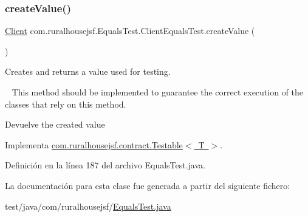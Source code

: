 \mbox{\label{classcom_1_1ruralhousejsf_1_1_equals_test_1_1_client_equals_test_aa74f54ea042862db1a5499d31ec75539}} 
\subsubsection{\texorpdfstring{createValue()}{createValue()}}
{\footnotesize\ttfamily \mbox{\hyperlink{classcom_1_1ruralhousejsf_1_1domain_1_1_client}{Client}} com.\+ruralhousejsf.\+Equals\+Test.\+Client\+Equals\+Test.\+create\+Value (\begin{DoxyParamCaption}{ }\end{DoxyParamCaption})}



Creates and returns a value used for testing. 

~\newline
 This method should be implemented to guarantee the correct execution of the classes that rely on this method.

\begin{DoxyReturn}{Devuelve}
the created value 
\end{DoxyReturn}


Implementa \mbox{\hyperlink{interfacecom_1_1ruralhousejsf_1_1contract_1_1_testable_ae4546a381488faaba1ef7c0f8688de9c}{com.\+ruralhousejsf.\+contract.\+Testable$<$ T $>$}}.



Definición en la línea 187 del archivo Equals\+Test.\+java.



La documentación para esta clase fue generada a partir del siguiente fichero\+:\begin{DoxyCompactItemize}
\item 
test/java/com/ruralhousejsf/\mbox{\hyperlink{_equals_test_8java}{Equals\+Test.\+java}}\end{DoxyCompactItemize}
